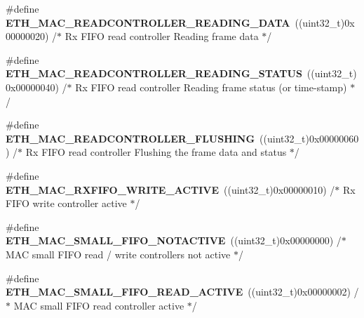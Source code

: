 \begin{DoxyCompactItemize}
\item 
\hypertarget{group___h_a_l___e_t_h___aliased___defines_ga056b776e92442c623c3d848314e6c8f0}{\#define {\bfseries E\-T\-H\-\_\-\-M\-A\-C\-\_\-\-R\-E\-A\-D\-C\-O\-N\-T\-R\-O\-L\-L\-E\-R\-\_\-\-R\-E\-A\-D\-I\-N\-G\-\_\-\-D\-A\-T\-A}~((uint32\-\_\-t)0x00000020)  /$\ast$ Rx F\-I\-F\-O read controller Reading frame data $\ast$/}\label{group___h_a_l___e_t_h___aliased___defines_ga056b776e92442c623c3d848314e6c8f0}

\item 
\hypertarget{group___h_a_l___e_t_h___aliased___defines_ga441228e7ee2416d37f22f5081d739e2c}{\#define {\bfseries E\-T\-H\-\_\-\-M\-A\-C\-\_\-\-R\-E\-A\-D\-C\-O\-N\-T\-R\-O\-L\-L\-E\-R\-\_\-\-R\-E\-A\-D\-I\-N\-G\-\_\-\-S\-T\-A\-T\-U\-S}~((uint32\-\_\-t)0x00000040)  /$\ast$ Rx F\-I\-F\-O read controller Reading frame status (or time-\/stamp) $\ast$/}\label{group___h_a_l___e_t_h___aliased___defines_ga441228e7ee2416d37f22f5081d739e2c}

\item 
\hypertarget{group___h_a_l___e_t_h___aliased___defines_ga7a4fe56723328085b9b80adbfb528a5d}{\#define {\bfseries E\-T\-H\-\_\-\-M\-A\-C\-\_\-\-R\-E\-A\-D\-C\-O\-N\-T\-R\-O\-L\-L\-E\-R\-\_\-\-F\-L\-U\-S\-H\-I\-N\-G}~((uint32\-\_\-t)0x00000060)  /$\ast$ Rx F\-I\-F\-O read controller Flushing the frame data and status $\ast$/}\label{group___h_a_l___e_t_h___aliased___defines_ga7a4fe56723328085b9b80adbfb528a5d}

\item 
\hypertarget{group___h_a_l___e_t_h___aliased___defines_gaed7a7d977c0411b7303270d6c35e19d2}{\#define {\bfseries E\-T\-H\-\_\-\-M\-A\-C\-\_\-\-R\-X\-F\-I\-F\-O\-\_\-\-W\-R\-I\-T\-E\-\_\-\-A\-C\-T\-I\-V\-E}~((uint32\-\_\-t)0x00000010)  /$\ast$ Rx F\-I\-F\-O write controller active $\ast$/}\label{group___h_a_l___e_t_h___aliased___defines_gaed7a7d977c0411b7303270d6c35e19d2}

\item 
\hypertarget{group___h_a_l___e_t_h___aliased___defines_gac16927a1916a399766258aa819372c68}{\#define {\bfseries E\-T\-H\-\_\-\-M\-A\-C\-\_\-\-S\-M\-A\-L\-L\-\_\-\-F\-I\-F\-O\-\_\-\-N\-O\-T\-A\-C\-T\-I\-V\-E}~((uint32\-\_\-t)0x00000000)  /$\ast$ M\-A\-C small F\-I\-F\-O read / write controllers not active $\ast$/}\label{group___h_a_l___e_t_h___aliased___defines_gac16927a1916a399766258aa819372c68}

\item 
\hypertarget{group___h_a_l___e_t_h___aliased___defines_gaaeb391df53728b1ee3d7dc0f26c89f05}{\#define {\bfseries E\-T\-H\-\_\-\-M\-A\-C\-\_\-\-S\-M\-A\-L\-L\-\_\-\-F\-I\-F\-O\-\_\-\-R\-E\-A\-D\-\_\-\-A\-C\-T\-I\-V\-E}~((uint32\-\_\-t)0x00000002)  /$\ast$ M\-A\-C small F\-I\-F\-O read controller active $\ast$/}\label{group___h_a_l___e_t_h___aliased___defines_gaaeb391df53728b1ee3d7dc0f26c89f05}


\end{DoxyCompactItemize}

